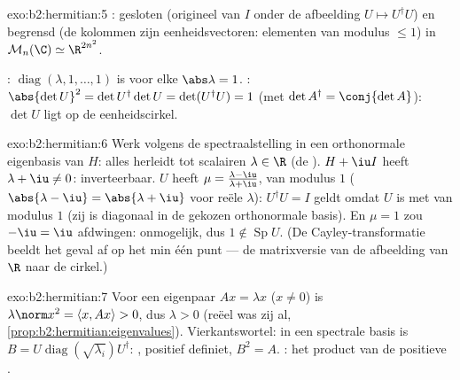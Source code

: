 \begin{solution}{exo:b2:hermitian:5}
: gesloten (origineel van $I$ onder de  afbeelding
$U \mapsto U^\dagger U$) en begrensd (de kolommen zijn
eenheidsvectoren: elementen van modulus $\leq 1$) in
$\mathcal{M}_n(\C) \simeq \R^{2n^2}$.

: $\operatorname{diag}(\lambda, 1, \dots, 1)$ is
 voor elke $\abs\lambda = 1$. : $\abs{\det U}^2 =
\det U^\dagger \det U = \det(U^\dagger U) = 1$ (met $\det A^\dagger
= \conj{\det A}$): $\det U$ ligt op de eenheidscirkel.
\end{solution}

\begin{solution}{exo:b2:hermitian:6}
Werk volgens de spectraalstelling in een orthonormale eigenbasis
van $H$: alles herleidt tot scalairen $\lambda \in \R$ (de
). $H + \iu I$ heeft  $\lambda + \iu \neq
0$: inverteerbaar. $U$ heeft  $\mu = \frac{\lambda -
\iu}{\lambda + \iu}$, van modulus $1$ ($\abs{\lambda - \iu} =
\abs{\lambda + \iu}$ voor reële $\lambda$): $U^\dagger U = I$ geldt
omdat $U$   is met  van modulus
$1$ (zij is diagonaal in de gekozen orthonormale basis). En $\mu =
1$ zou $-\iu = \iu$ afdwingen: onmogelijk, dus $1 \notin
\operatorname{Sp} U$. (De Cayley-transformatie beeldt het
 geval af op het  min één punt --- de
matrixversie van de afbeelding van $\R$ naar de cirkel.)
\end{solution}

\begin{solution}{exo:b2:hermitian:7}
Voor een eigenpaar $Ax = \lambda x$ ($x \neq 0$) is
$\lambda\norm x^2 = \langle x, Ax\rangle > 0$, dus $\lambda > 0$
(reëel was zij al, \cref{prop:b2:hermitian:eigenvalues}).
Vierkantswortel: in een spectrale basis is $B =
U\operatorname{diag}(\sqrt{\lambda_i})U^\dagger$: ,
positief definiet, $B^2 = A$. : het product van de
positieve .
\end{solution}

